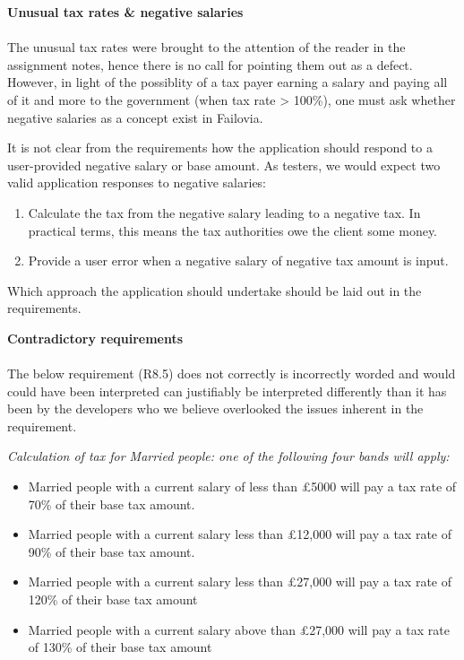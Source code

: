 \textbf{Unusual tax rates \& negative salaries \\}
\\
The unusual tax rates were brought to the attention of the reader in the assignment notes, hence there is no call for pointing them out as a defect. However, in light of the possiblity of a tax payer earning a salary and paying all of it and more to the government (when tax rate > 100\%), one must ask whether negative salaries as a concept exist in Failovia. 
\par
It is not clear from the requirements how the application should respond to a user-provided negative salary or base amount. As testers, we would expect two valid application responses to negative salaries: 

\begin{enumerate}
	\item Calculate the tax from the negative salary leading to a negative tax. In practical terms, this means the tax authorities owe the client some money.
	\item Provide a user error when a negative salary of negative tax amount is input. 
\end{enumerate}

Which approach the application should undertake should be laid out in the requirements.

\textbf{Contradictory requirements\\}
\\
The below requirement (R8.5) does not correctly  is incorrectly worded and would could have been interpreted  can justifiably be interpreted differently than it has been by the developers who we believe overlooked the issues inherent in the requirement. 
\par
{\it
	\small
Calculation of tax for Married people: one of the following four bands will apply:
\begin{itemize}[noitemsep]
	\item Married people with a current salary of less than £5000 will pay a tax rate of
	70\% of their base tax amount.
	\item Married people with a current salary less than £12,000 will pay a tax rate of
	90\% of their base tax amount.
	\item Married people with a current salary less than £27,000 will pay a tax rate of
	120\% of their base tax amount
	\item Married people with a current salary above than £27,000 will pay a tax rate
	of 130\% of their base tax amount
\end{itemize}	
}

